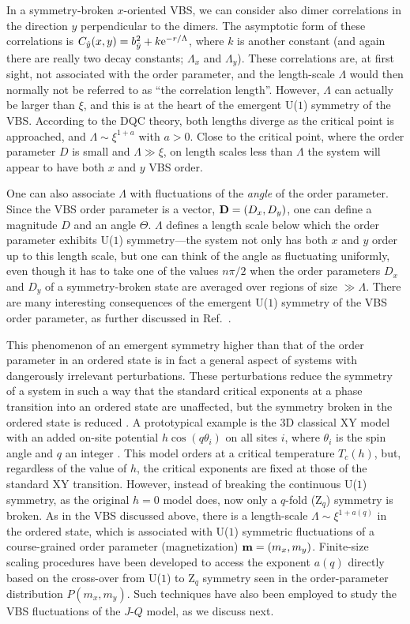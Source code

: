 \documentclass[10pt,pre,aps,twocolumn,showpacs,superscriptaddress,floatfix]{revtex4-1}
\begin{document}
In a symmetry-broken $x$-oriented VBS, we can consider also dimer correlations in the direction $y$ perpendicular to the dimers. The asymptotic form of these 
correlations is $C_{\hat y}(x,y) = b_{\hat y}^2 + k{\rm e}^{-r/\Lambda}$, where $k$ is another constant (and again there are really two decay constants; $\Lambda_x$ and
$\Lambda_y$). These correlations are, at first sight, not associated with the order parameter, and the length-scale $\Lambda$ would then normally not be referred 
to as ``the correlation length''. However, $\Lambda$ can actually be larger than $\xi$, and this is at the heart of the emergent U($1$) symmetry of the VBS. 
According to the DQC theory, both lengths diverge as the critical point is approached, and $\Lambda \sim \xi^{1+a}$ with $a>0$. Close to the critical point, 
where the order parameter $D$ is small and $\Lambda \gg \xi$, on length scales less than $\Lambda$ the system will appear to have both $x$ and $y$ VBS order.

One can also associate $\Lambda$ with fluctuations of the {\it angle} of the order parameter. Since the VBS order parameter is a vector, ${\bf D}= (D_x,D_y)$, 
one can define a magnitude $D$ and an angle $\Theta$. $\Lambda$ defines a length scale below which the order parameter exhibits U($1$) symmetry---the system
not only has both $x$ and $y$ order up to this length scale, but one can think of the angle as fluctuating uniformly, even though it has to take one of the 
values $n\pi/2$ when the order parameters $D_x$ and $D_y$ of a symmetry-broken state are averaged over regions of size $\gg \Lambda$. There are many interesting 
consequences of the emergent U($1$) symmetry of the VBS order parameter, as further discussed in Ref.~\cite{Sandvik12}.

This phenomenon of an emergent symmetry higher than that of the order parameter in an ordered state is in fact a general aspect of systems with 
dangerously irrelevant perturbations. These perturbations reduce the symmetry of a system in such a way that the standard critical exponents 
at a phase transition into an ordered state are unaffected, but the symmetry broken in the ordered state is reduced \cite{Jose77,Oshikawa00}. A 
prototypical example is the 3D classical XY model with an added on-site potential $h\cos(q\theta_i)$ on all sites $i$, where $\theta_i$ is the spin 
angle and $q$ an integer \cite{Carmona00}. This model orders at a critical temperature $T_c(h)$, but, regardless of the value of $h$, the critical exponents 
are fixed at those of the standard XY transition. However, instead of breaking the continuous U($1$) symmetry, as the original $h=0$ model does, 
now only a $q$-fold (Z$_q$) symmetry is broken. As in the VBS discussed above, there is a length-scale $\Lambda \sim \xi^{1+a(q)}$ in the ordered state, which 
is associated with U($1$) symmetric fluctuations of a course-grained order parameter (magnetization) ${\bf m}=(m_x,m_y)$. Finite-size scaling procedures have been 
developed \cite{Lou07} to access the exponent $a(q)$ directly based on the cross-over from U($1$) to Z$_q$ symmetry seen in the order-parameter distribution 
$P(m_x,m_y)$. Such techniques have also been employed to study the VBS fluctuations of the $J$-$Q$ model, as we discuss next.
\end{document}
